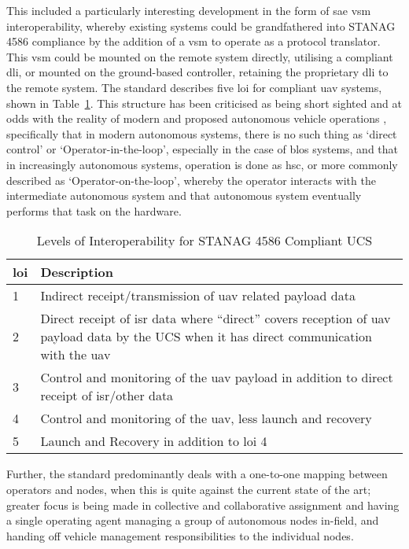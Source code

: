 This included a particularly interesting development in the form of \gls{sae} \gls{vsm} interoperability, whereby existing systems could be grandfathered into STANAG 4586 compliance by the addition of a \gls{vsm} to operate as a protocol translator.
This \gls{vsm} could be mounted on the remote system directly, utilising a compliant \gls{dli}, or mounted on the ground-based controller, retaining the proprietary \gls{dli} to the remote system.
The standard describes five \acrfull{loi} for compliant \gls{uav} systems, shown in Table~\ref{tab:levels_of_interoperability}.
This structure has been criticised as being short sighted and at odds with the reality of modern and proposed autonomous vehicle operations \cite{Cummings2010}, specifically that in modern autonomous systems, there is no such thing as ‘direct control’ or ‘Operator-in-the-loop’, especially in the case of \gls{blos} systems, and that in increasingly autonomous systems, operation is done as \gls{hsc}, or more commonly described as ‘Operator-on-the-loop’, whereby the operator interacts with the intermediate autonomous system and that autonomous system eventually performs that task on the hardware.

\begin{table}
  \begin{tabularx}{\textwidth}{lX}
    \toprule
    \gls{loi} &  Description\\ \midrule
    1 &  Indirect receipt/transmission of \gls{uav} related payload data\\ 
    2 &  Direct receipt of \gls{isr} data where “direct” covers reception of \gls{uav} payload data by the UCS when it has direct communication with the \gls{uav}\\ 
    3 &  Control and monitoring of the \gls{uav} payload in addition to direct receipt of \gls{isr}/other data\\ 
    4 &  Control and monitoring of the \gls{uav}, less launch and recovery\\
    5 &  Launch and Recovery in addition to \gls{loi} 4\\ 
    \bottomrule 
  \end{tabularx}
  \caption[\gls{loi} for STANAG 4586 Compliant UCS]{Levels of Interoperability for STANAG 4586 Compliant UCS \cite{STANAG4586}}
  \label{tab:levels_of_interoperability}
\end{table}

Further, the standard predominantly deals with a one-to-one mapping between operators and nodes, when this is quite against the current state of the art; greater focus is being made in collective and collaborative assignment and having a single operating agent managing a group of autonomous nodes in-field, and handing off vehicle management responsibilities to the individual nodes.

